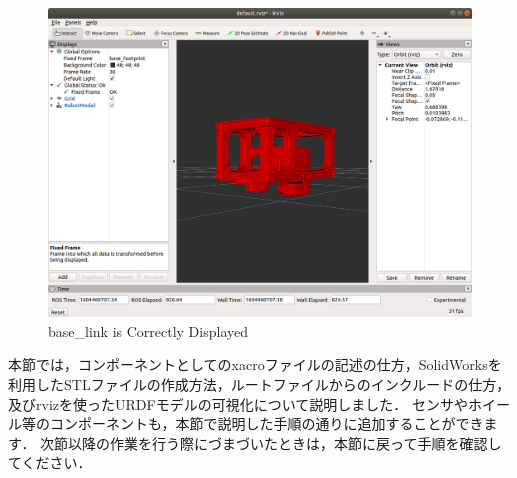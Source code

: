 \documentclass[{../../master}]{subfiles}
\begin{document}
\begin{figure}[ht]
  \centering
  \includegraphics[width=100truemm]{images/rviz_robot_model_successfully_viewed.png}
  \caption{\textsf{base\_link} is Correctly Displayed}
  \label{fig:rviz_robot_model_subccessfully_viewed}
\end{figure}

本節では，コンポーネントとしてのxacroファイルの記述の仕方，SolidWorksを利用したSTLファイルの作成方法，ルートファイルからのインクルードの仕方，及び\textsf{rviz}を使ったURDFモデルの可視化について説明しました．
センサやホイール等のコンポーネントも，本節で説明した手順の通りに追加することができます．
次節以降の作業を行う際にづまづいたときは，本節に戻って手順を確認してください．
\end{document}
